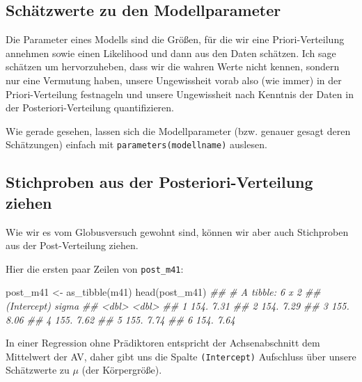 \documentclass[
  a4paper,
  DIV=11]{scrreprt}
\newenvironment{Shaded}{\begin{snugshade}}{\end{snugshade}}
\newcommand{\DocumentationTok}[1]{\textcolor[rgb]{0.37,0.37,0.37}{\textit{#1}}}
\newcommand{\FunctionTok}[1]{\textcolor[rgb]{0.28,0.35,0.67}{#1}}
\newcommand{\NormalTok}[1]{\textcolor[rgb]{0.00,0.23,0.31}{#1}}
\newcommand{\OtherTok}[1]{\textcolor[rgb]{0.00,0.23,0.31}{#1}}
\theoremstyle{definition}
\theoremstyle{remark}
\begin{document}
\hypertarget{schuxe4tzwerte-zu-den-modellparameter}{%
\subsection{Schätzwerte zu den
Modellparameter}\label{schuxe4tzwerte-zu-den-modellparameter}}

Die Parameter eines Modells sind die Größen, für die wir eine
Priori-Verteilung annehmen sowie einen Likelihood und dann aus den Daten
schätzen. Ich sage schätzen um hervorzuheben, dass wir die wahren Werte
nicht kennen, sondern nur eine Vermutung haben, unsere Ungewissheit
vorab also (wie immer) in der Priori-Verteilung festnageln und unsere
Ungewissheit nach Kenntnis der Daten in der Posteriori-Verteilung
quantifizieren.

Wie gerade gesehen, lassen sich die Modellparameter (bzw. genauer gesagt
deren Schätzungen) einfach mit \texttt{parameters(modellname)} auslesen.

\hypertarget{stichproben-aus-der-posteriori-verteilung-ziehen}{%
\subsection{Stichproben aus der Posteriori-Verteilung
ziehen}\label{stichproben-aus-der-posteriori-verteilung-ziehen}}

Wie wir es vom Globusversuch gewohnt sind, können wir aber auch
Stichproben aus der Post-Verteilung ziehen.

Hier die ersten paar Zeilen von \texttt{post\_m41}:

\begin{Shaded}
\begin{Highlighting}[]
\NormalTok{post\_m41 }\OtherTok{\textless{}{-}} \FunctionTok{as\_tibble}\NormalTok{(m41)}
\FunctionTok{head}\NormalTok{(post\_m41)}
\DocumentationTok{\#\# \# A tibble: 6 x 2}
\DocumentationTok{\#\#   \textasciigrave{}(Intercept)\textasciigrave{} sigma}
\DocumentationTok{\#\#           \textless{}dbl\textgreater{} \textless{}dbl\textgreater{}}
\DocumentationTok{\#\# 1          154.  7.31}
\DocumentationTok{\#\# 2          154.  7.29}
\DocumentationTok{\#\# 3          155.  8.06}
\DocumentationTok{\#\# 4          155.  7.62}
\DocumentationTok{\#\# 5          155.  7.74}
\DocumentationTok{\#\# 6          154.  7.64}
\end{Highlighting}
\end{Shaded}

In einer Regression ohne Prädiktoren entspricht der Achsenabschnitt dem
Mittelwert der AV, daher gibt uns die Spalte \texttt{(Intercept)}
Aufschluss über unsere Schätzwerte zu \(\mu\) (der Körpergröße).
\end{document}
